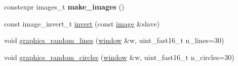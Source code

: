 \begin{DoxyCompactItemize}
\mbox{\label{namespacehwlib_af0735cb7aee25e2ff3c65a8f2efed6f2}} 
constexpr images\+\_\+t {\bfseries make\+\_\+images} ()
\item 
const image\+\_\+invert\+\_\+t \hyperlink{namespacehwlib_ab619d7f70bb62112b2a04192f5103a24}{invert} (const \hyperlink{classhwlib_1_1image}{image} \&slave)
\item 
void \hyperlink{namespacehwlib_a6565c83ceab3983476ae71596ddb49a5}{graphics\+\_\+random\+\_\+lines} (\hyperlink{classhwlib_1_1window}{window} \&w, uint\+\_\+fast16\+\_\+t n\+\_\+lines=30)
\item 
void \hyperlink{namespacehwlib_a1adc4e1384730a5ea80a1db07a4b22ae}{graphics\+\_\+random\+\_\+circles} (\hyperlink{classhwlib_1_1window}{window} \&w, uint\+\_\+fast16\+\_\+t n\+\_\+circles=30)
\item 
\mbox{\label{namespacehwlib_ae9782ffebd06ef5e27b19e0e1831ad5e}} 

\end{DoxyCompactItemize}
